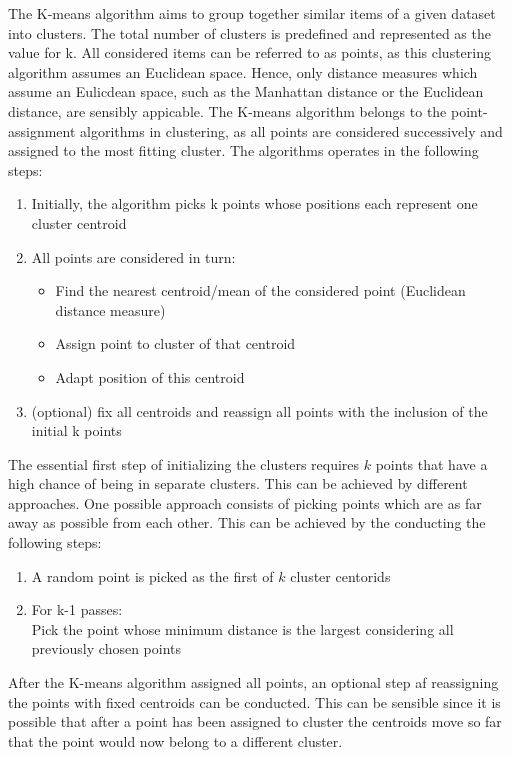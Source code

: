 The K-means algorithm aims to group together similar items of a given dataset into clusters. 
The total number of clusters is predefined and represented as the value for k. All considered items can be referred to as points, as this clustering algorithm assumes an Euclidean space. Hence, only distance measures which assume an Eulicdean space, such as the Manhattan distance or the Euclidean distance, are sensibly appicable. The K-means algorithm belongs to the point-assignment algorithms in clustering, as all points are considered successively and assigned to the most fitting cluster. The algorithms operates in the following steps:
\begin{enumerate}
	\item Initially, the algorithm picks k points whose positions each represent one cluster centroid
	\item All points are considered in turn:
	\begin{itemize}
		\item Find the nearest centroid/mean of the considered point (Euclidean distance measure)
		\item Assign point to cluster of that centroid
		\item Adapt position of this centroid
	\end{itemize}	
	
	\item (optional) fix all centroids and reassign all points with the inclusion of the initial k points
	
\end{enumerate}

The essential first step of initializing the clusters requires $k$ points that have a high chance of being in separate clusters. This can be achieved by different approaches. One possible approach consists of picking points which are as far away as possible from each other. This can be achieved by the conducting the following steps:
\begin{enumerate}
	\item	A random point is picked as the first of $k$ cluster centorids
	\item	For k-1 passes: \\
	Pick the point whose minimum distance is the largest considering all previously chosen points
	
\end{enumerate}
After the K-means algorithm assigned all points, an optional step af reassigning the points with fixed centroids can be conducted. This can be sensible since it is possible that after a point has been assigned to cluster the centroids move so far that the point would now belong to a different cluster.
